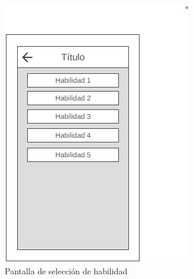 \begin{figure}[H]
    \centering
    \includegraphics[scale=0.6]{Figures/Mockups/Mock_SeleccionHabilidad.png}
    \caption{Pantalla de selección de habilidad}
    \label{SeleccionHabilidad}    
\end{figure}

